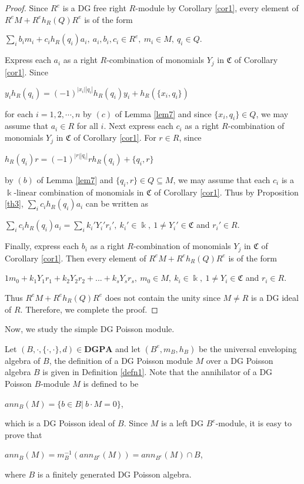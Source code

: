 \documentclass[a4paper,10pt]{amsart}
\theoremstyle{definition}
\theoremstyle{remark}
\numberwithin{equation}{section}
\begin{document}
\begin{proof}
Since $R^{e}$ is a DG free right $R$-module by Corollary \ref{cor1}, every
element of $R^{e}M+R^{e}h_R(Q)R^{e}$ is of the form
\begin{center}
$\sum_{i}b_im_i+c_ih_R(q_i)a_i, ~a_i, b_i, c_i\in R^{e}, ~m_i\in M,
~q_i\in Q.$
\end{center}
Express each $a_i$ as a right $R$-combination of monomials $Y_j$ in
$\mathfrak{C}$ of Corollary \ref{cor1}. Since
\begin{center}
$y_ih_R(q_i)=(-1)^{|x_i||q_i|}h_R(q_i)y_i+h_R(\{x_i, q_i\})$
\end{center}
for each $i=1,2, \cdots, n$ by $(c)$ of Lemma \ref{lem7} and since $\{x_i,
q_i\}\in Q$, we may assume that $a_i\in R$ for all $i$. Next express
each $c_i$ as a right $R$-combination of monomials $Y_j$ in
$\mathfrak{C}$ of Corollary \ref{cor1}. For $r\in R$, since
\begin{center}
$h_R(q_i)r=(-1)^{|r||q_i|}rh_R(q_i)+\{q_i, r\}$
\end{center}
by $(b)$ of Lemma \ref{lem7} and $\{q_i, r\}\in Q\subseteq M$, we may
assume that each $c_i$ is a $\Bbbk$-linear combination of monomials
in $\mathfrak{C}$ of Corollary \ref{cor1}. Thus by Proposition \ref{th3},
$\sum_{i}c_ih_R(q_i)a_i$ can be written as
\begin{center}
$\sum_{i}c_ih_R(q_i)a_i=\sum_{i}k_i'Y_i'r_i', ~k_i'\in \Bbbk, ~1\neq
Y_i'\in\mathfrak{C}$ and $r_i'\in R.$
\end{center}
Finally, express each $b_i$ as a right $R$-combination of monomials
$Y_j$ in $\mathfrak{C}$ of Corollary \ref{cor1}. Then every element of
$R^{e}M+R^{e}h_R(Q)R^{e}$ is of the form
\begin{center}
$1m_0+k_1Y_1r_1+k_2Y_2r_2+...+k_sY_sr_s, ~m_0\in M, ~k_i\in \Bbbk, ~1\neq Y_i\in\mathfrak{C}$ and $r_i\in R.$
\end{center}
Thus $R^{e}M+R^{e}h_R(Q)R^{e}$ does not contain the unity since $M\neq R$ is a DG ideal of $R$. Therefore, we complete the proof.
\end{proof}

Now, we study the simple DG Poisson module.

Let $(B, \cdot, \{\cdot, \cdot\}, d)\in \textbf{DGPA}$ and let $(B^{e}, m_B,
h_B)$ be the universal enveloping algebra of $B$, the definition of
a DG Poisson module $M$ over a DG Poisson algebra $B$ is given in
Definition \ref{defn1}. Note that the annihilator of a DG Poisson $B$-module
$M$ is defined to be
\begin{center}
$ann_B(M)=\{b\in B | ~b\cdot M=0\}$,
\end{center}
which is a DG Poisson ideal of $B$. Since $M$ is a left DG
$B^{e}$-module, it is easy to prove that
\begin{center}
$ann_B(M)=m_B^{-1}(ann_{B^{e}}(M))=ann_{B^{e}}(M)\cap B$,
\end{center}
where $B$ is a finitely generated DG Poisson algebra.
\end{document}
